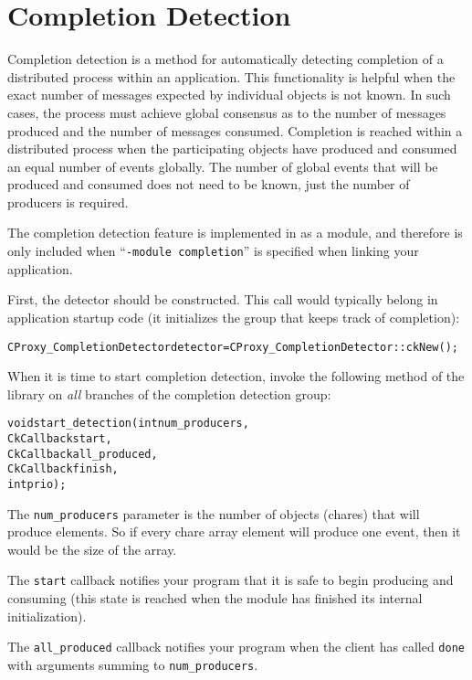 \section{Completion Detection}

Completion detection is a method for automatically detecting completion of a
distributed process within an application. This functionality is helpful when
the exact number of messages expected by individual objects is not known. In
such cases, the process must achieve global consensus as to the number of
messages produced and the number of messages consumed.  Completion is reached
within a distributed process when the participating objects have produced and
consumed an equal number of events globally. The number of global events that
will be produced and consumed does not need to be known, just the number of
producers is required.


The completion detection feature is implemented in \charmpp{} as a
module, and therefore is only included when ``{\tt -module completion}'' is
specified when linking your application.

First, the detector should be constructed. This call would typically
belong in application startup code (it initializes the group that
keeps track of completion):

\begin{alltt}
CProxy_CompletionDetector detector = CProxy_CompletionDetector::ckNew();
\end{alltt}

When it is time to start completion detection, invoke the following method of the
library on {\em all} branches of the completion detection group:

\begin{alltt}
void start_detection(int num_producers,
                     CkCallback start,
                     CkCallback all_produced,
                     CkCallback finish,
                     int prio);
\end{alltt}

The \verb|num_producers| parameter is the number of objects (chares)
that will produce elements. So if every chare array element will produce one
event, then it would be the size of the array.

The \verb|start| callback notifies your program that it is safe to
begin producing and consuming (this state is reached when the module
has finished its internal initialization).

The \verb|all_produced| callback notifies your program when the client has
called \verb|done| with arguments summing to \verb|num_producers|.

